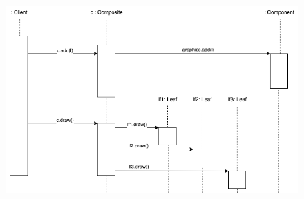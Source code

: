 \begin{figure}[H]
    \centering
    \includegraphics[width=1\linewidth]{assets/pattern/composite/composite-activity.drawio.png}
\end{figure}

\newpage